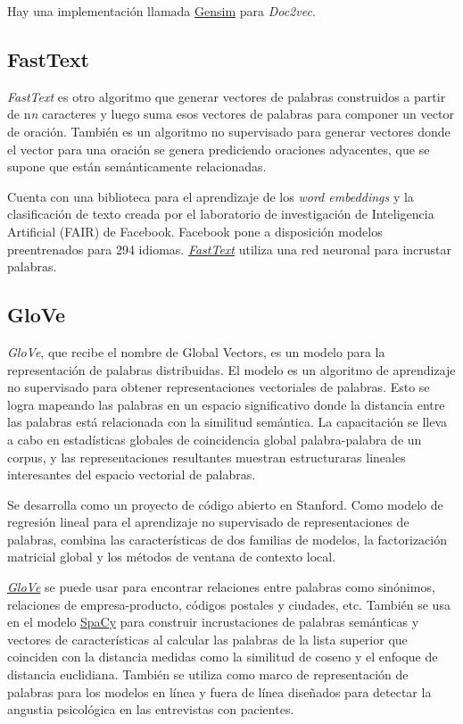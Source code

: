 \documentclass[titlepage]{article}
\begin{document}
	Hay una implementación llamada \href{https://radimrehurek.com/gensim/}{Gensim} para \textit{Doc2vec}.
	
	\subsection{FastText}
	
	\textit{FastText} es otro algoritmo que generar vectores de palabras construidos a partir de n\textit{n} caracteres y luego suma esos vectores de palabras para componer un vector de oración. También es un algoritmo no supervisado para generar vectores donde el vector para una oración se genera prediciendo oraciones adyacentes, que se supone que están semánticamente relacionadas.
	
	\newpage
	
	Cuenta con una biblioteca para el aprendizaje de los \textit{word embeddings} y la clasificación de texto creada por el laboratorio de investigación de Inteligencia Artificial (FAIR) de Facebook. Facebook pone a disposición modelos preentrenados para 294 idiomas. \href{https://techcrunch.com/2016/08/18/facebooks-artificial-intelligence-research-lab-releases-open-source-fasttext-on-github/}{\textit{FastText}} utiliza una red neuronal para incrustar palabras.
	
	\subsection{GloVe}
	
	\textit{GloVe}, que recibe el nombre de Global Vectors, es un modelo para la representación de palabras distribuidas. El modelo es un algoritmo de aprendizaje no supervisado para obtener representaciones vectoriales de palabras. Esto se logra mapeando las palabras en un espacio significativo donde la distancia entre las palabras está relacionada con la similitud semántica. La capacitación se lleva a cabo en estadísticas globales de coincidencia global palabra-palabra de un corpus, y las representaciones resultantes muestran estructuraras lineales interesantes del espacio vectorial de palabras. 
	
	Se desarrolla como un proyecto de código abierto en Stanford.  Como modelo de regresión lineal para el aprendizaje no supervisado de representaciones de palabras, combina las características de dos familias de modelos, la factorización matricial global y los métodos de ventana de contexto local.
	
	\href{https://www.aclweb.org/anthology/D14-1162/}{\textit{GloVe}} se puede usar para encontrar relaciones entre palabras como sinónimos, relaciones de empresa-producto, códigos postales y ciudades, etc. También se usa en el modelo \href{https://spacy.io/}{SpaCy} para construir incrustaciones de palabras semánticas y vectores de características al calcular las palabras de la lista superior que coinciden con la distancia medidas como la similitud de coseno y el enfoque de distancia euclidiana. También se utiliza como marco de representación de palabras para los modelos en línea y fuera de línea diseñados para detectar la angustia psicológica en las entrevistas con pacientes. 
	
\end{document}
